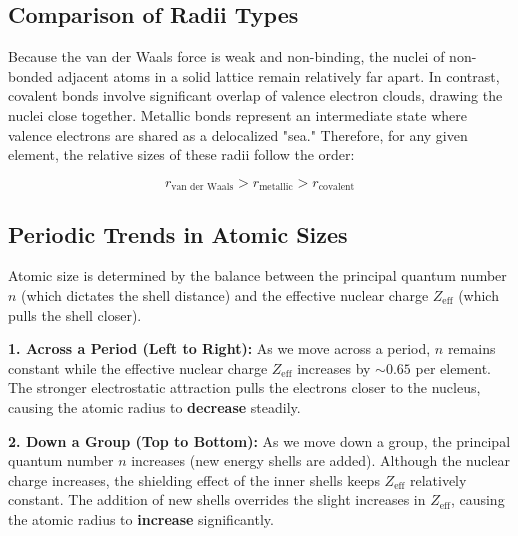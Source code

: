 \documentclass[12pt,a4paper]{article}
\begin{document}
\subsection{Comparison of Radii Types}
Because the van der Waals force is weak and non-binding, the nuclei of non-bonded adjacent atoms in a solid lattice remain relatively far apart. In contrast, covalent bonds involve significant overlap of valence electron clouds, drawing the nuclei close together. Metallic bonds represent an intermediate state where valence electrons are shared as a delocalized "sea." Therefore, for any given element, the relative sizes of these radii follow the order:

\begin{tcolorbox}[formulabox, title={Radii Comparison Trend}]
  \[ r_{\text{van der Waals}} > r_{\text{metallic}} > r_{\text{covalent}} \]
\end{tcolorbox}

\subsection{Periodic Trends in Atomic Sizes}
Atomic size is determined by the balance between the principal quantum number $n$ (which dictates the shell distance) and the effective nuclear charge $Z_{\text{eff}}$ (which pulls the shell closer).

\textbf{1. Across a Period (Left to Right):}
As we move across a period, $n$ remains constant while the effective nuclear charge $Z_{\text{eff}}$ increases by $\sim 0.65$ per element. The stronger electrostatic attraction pulls the electrons closer to the nucleus, causing the atomic radius to \textbf{decrease} steadily.

\textbf{2. Down a Group (Top to Bottom):}
As we move down a group, the principal quantum number $n$ increases (new energy shells are added). Although the nuclear charge increases, the shielding effect of the inner shells keeps $Z_{\text{eff}}$ relatively constant. The addition of new shells overrides the slight increases in $Z_{\text{eff}}$, causing the atomic radius to \textbf{increase} significantly.
\end{document}
